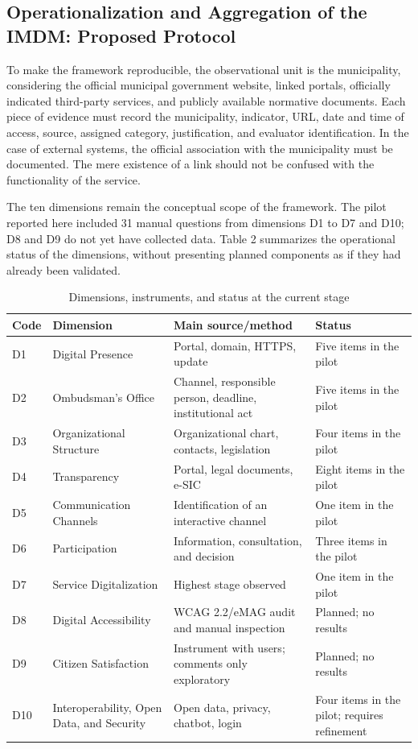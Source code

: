 \documentclass[12pt]{article}
\begin{document}
\subsection{Operationalization and Aggregation of the IMDM: Proposed Protocol}

To make the framework reproducible, the observational unit is the municipality, considering the official municipal government website, linked portals, officially indicated third-party services, and publicly available normative documents. Each piece of evidence must record the municipality, indicator, URL, date and time of access, source, assigned category, justification, and evaluator identification. In the case of external systems, the official association with the municipality must be documented. The mere existence of a link should not be confused with the functionality of the service.

The ten dimensions remain the conceptual scope of the framework. The pilot reported here included 31 manual questions from dimensions D1 to D7 and D10; D8 and D9 do not yet have collected data. Table 2 summarizes the operational status of the dimensions, without presenting planned components as if they had already been validated.

\begin{table}[htbp]\centering\footnotesize
\caption{Dimensions, instruments, and status at the current stage}
\begin{tabular}{L{1.1cm}L{4.5cm}L{4.0cm}L{3.6cm}}\toprule
\textbf{Code} & \textbf{Dimension} & \textbf{Main source/method} & \textbf{Status}\\\midrule
D1 & Digital Presence & Portal, domain, HTTPS, update & Five items in the pilot\\
D2 & Ombudsman's Office & Channel, responsible person, deadline, institutional act & Five items in the pilot\\
D3 & Organizational Structure & Organizational chart, contacts, legislation & Four items in the pilot\\
D4 & Transparency & Portal, legal documents, e-SIC & Eight items in the pilot\\
D5 & Communication Channels & Identification of an interactive channel & One item in the pilot\\
D6 & Participation & Information, consultation, and decision & Three items in the pilot\\
D7 & Service Digitalization & Highest stage observed & One item in the pilot\\
D8 & Digital Accessibility & WCAG 2.2/eMAG audit and manual inspection & Planned; no results\\
D9 & Citizen Satisfaction & Instrument with users; comments only exploratory & Planned; no results\\
D10 & Interoperability, Open Data, and Security & Open data, privacy, chatbot, login & Four items in the pilot; requires refinement\\\bottomrule
\end{tabular}\end{table}
\end{document}
